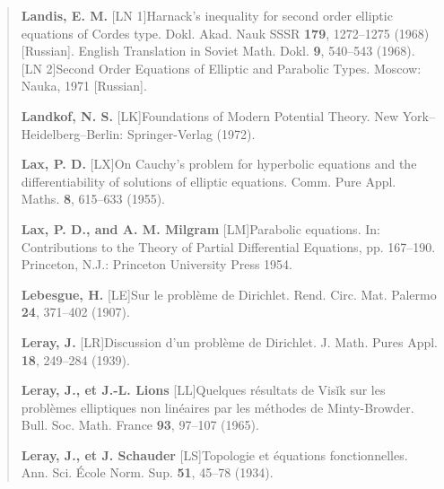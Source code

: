 \begin{quote}
\medskip

\textbf{Landis, E. M.}
\newline
{}[LN 1]\quad Harnack's inequality for second order elliptic equations of Cordes type. Dokl. Akad.\newline
Nauk SSSR \textbf{179}, 1272--1275 (1968) [Russian]. English Translation in Soviet Math. Dokl.\newline
\textbf{9}, 540--543 (1968).
\newline
{}[LN 2]\quad Second Order Equations of Elliptic and Parabolic Types. Moscow: Nauka, 1971 [Russian].

\medskip

\textbf{Landkof, N. S.}
\newline
{}[LK]\quad Foundations of Modern Potential Theory. New York--Heidelberg--Berlin: Springer-Verlag\newline
(1972).

\medskip

\textbf{Lax, P. D.}
\newline
{}[LX]\quad On Cauchy's problem for hyperbolic equations and the differentiability of solutions of\newline
elliptic equations. Comm. Pure Appl. Maths. \textbf{8}, 615--633 (1955).

\medskip

\textbf{Lax, P. D., and A. M. Milgram}
\newline
{}[LM]\quad Parabolic equations. In: Contributions to the Theory of Partial Differential Equations,\newline
pp. 167--190. Princeton, N.J.: Princeton University Press 1954.

\medskip

\textbf{Lebesgue, H.}
\newline
{}[LE]\quad Sur le probl\`eme de Dirichlet. Rend. Circ. Mat. Palermo \textbf{24}, 371--402 (1907).

\medskip

\textbf{Leray, J.}
\newline
{}[LR]\quad Discussion d'un probl\`eme de Dirichlet. J. Math. Pures Appl. \textbf{18}, 249--284 (1939).

\medskip

\textbf{Leray, J., et J.-L. Lions}
\newline
{}[LL]\quad Quelques r\'esultats de Vis\v{i}k sur les probl\`emes elliptiques non lin\'eaires par les m\'ethodes de\newline
Minty-Browder. Bull. Soc. Math. France \textbf{93}, 97--107 (1965).

\medskip

\textbf{Leray, J., et J. Schauder}
\newline
{}[LS]\quad Topologie et \'{e}quations fonctionnelles. Ann. Sci. \'{E}cole Norm. Sup. \textbf{51}, 45--78 (1934).
\end{quote}

